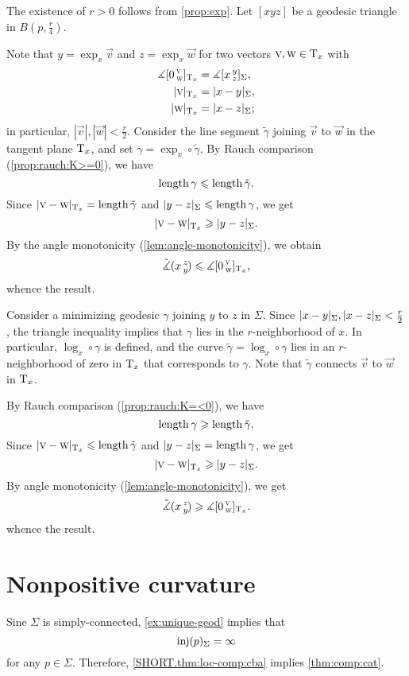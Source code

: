 The existence of $r>0$ follows from \ref{prop:exp}.
Let $[xyz]$ be a geodesic triangle in $B(p,\tfrac{r}4)$.

Note that $y=\exp_x\vec v$ and $z=\exp_x\vec w$ for two vectors $\text{\sc{v}},\text{\sc{w}}\in\mathrm{T}_x$ with
\begin{align*}
\measuredangle\hinge 0{\vec v}{\vec w}_{\T_x}&=\measuredangle\hinge xyz_\Sigma,
\\
|\vec v|_{\T_x}&=\dist{x}{y}\Sigma, 
\\
|\vec w|_{\T_x}&=\dist{x}{z}\Sigma;
\end{align*}
in particular, $|\vec v|, |\vec w|< \tfrac r2$.
Consider the line segment $\tilde \gamma$ joining $\vec v$ to $\vec w$ in the tangent plane $\mathrm{T}_x$, and set $\gamma=\exp_x\circ\tilde \gamma$.
By Rauch comparison (\ref{prop:rauch:K>=0}), we have
\[\mathop{\rm length}\nolimits\gamma\leqslant \mathop{\rm length}\nolimits \tilde \gamma.\]
Since $\dist{\vec v}{\vec w}{\T_x}=\length\tilde \gamma$ and $\dist{y}{z}\Sigma\le \length\gamma$, we get 
\[\dist{\vec v}{\vec w}{\T_x}\ge \dist{y}{z}\Sigma.\]
By the angle monotonicity (\ref{lem:angle-monotonicity}), we obtain
\[\tilde\measuredangle(x\,{}^{z}_{y}\hspace{-0.2ex})\leqslant\measuredangle[0\,{}^{\text{\sc{v}}}_{\text{\sc{w}}}]_{\mathrm{T}_x},\]
whence the result.

Consider a minimizing geodesic $\gamma$ joining $y$ to $z$ in $\Sigma$.
Since $\dist{x}{y}{\Sigma},\dist{x}{z}{\Sigma}\z<\tfrac r2$, the triangle inequality implies that $\gamma$ lies in the $r$-neighborhood of $x$.
In particular, $\log_x\circ\gamma$ is defined, and the curve
$\tilde \gamma=\log_x\circ\gamma$ lies in an $r$-neighborhood of zero in $\mathrm{T}_x$ that corresponds to $\gamma$.
Note that $\tilde\gamma$ connects $\vec v$ to $\vec w$ in $\mathrm{T}_x$.

By Rauch comparison (\ref{prop:rauch:K=<0}), we have
\[\mathop{\rm length}\nolimits\gamma\geqslant \mathop{\rm length}\nolimits \tilde \gamma.\]
Since $\dist{\vec v}{\vec w}{\T_x}\le\length\tilde \gamma$ and $\dist{y}{z}{\Sigma}= \length\gamma$, we get 
\[\dist{\vec v}{\vec w}{\T_x}\ge \dist{y}{z}\Sigma.\]
By angle monotonicity (\ref{lem:angle-monotonicity}), we get
\[\tilde\measuredangle(x\,{}^{z}_{y}\hspace{-0.2ex})\geqslant\measuredangle[0\,{}^{\text{\sc{v}}}_{\text{\sc{w}}}]_{\mathrm{T}_x}.\]
whence the result.
\qeds

\section{Nonpositive curvature}\label{sec:nonpos-comp}

Sine $\Sigma$ is simply-connected, \ref{ex:unique-geod} implies that 
\[\mathop{\rm inj}\nolimits(p)_\Sigma=\infty\]
for any $p\in\Sigma$.
Therefore, \ref{SHORT.thm:loc-comp:cba} implies \ref{thm:comp:cat}.
\qeds

